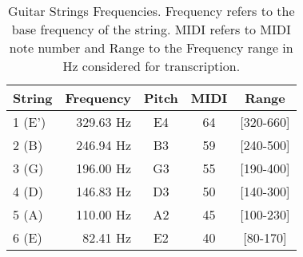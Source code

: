 \begin{table}[ht!]
\centering

  \begin{tabular}{  l r c c c }
    \hline
	String & Frequency & Pitch & MIDI & Range\\ \hline
    1 (E') & 329.63 Hz & E4 & 64 & [320-660]\\ 
    2 (B) & 246.94 Hz & B3 & 59 & [240-500]\\
    3 (G) & 196.00 Hz & G3 & 55 & [190-400]\\
    4 (D) & 146.83 Hz & D3 & 50 & [140-300]\\
    5 (A) & 110.00 Hz & A2 & 45 & [100-230]\\
    6 (E) & 82.41 Hz & E2 & 40 & [80-170]\\
    \hline
  \end{tabular}

  \caption[Guitar Strings Frequencies.]{Guitar Strings Frequencies. Frequency refers to the base frequency of the string. MIDI refers to MIDI note number and Range to the Frequency range in Hz considered for transcription.}
  \label{tab:guitar_strings}

\end{table}
